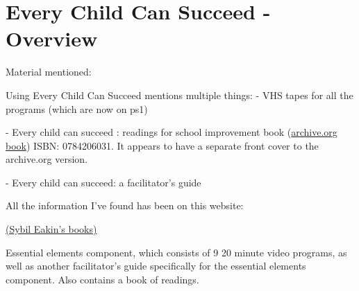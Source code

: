 \chapter{Every Child Can Succeed - Overview}

Material mentioned:

Using Every Child Can Succeed mentions multiple things:
- VHS tapes for all the programs (which are now on ps1)

- Every child can succeed : readings for school improvement book (\href{https://archive.org/details/everychildcansuc0000unse/mode/2up}{archive.org book})
ISBN: 0784206031. It appears to have a separate front cover to the archive.org version.

- Every child can succeed: a facilitator's guide

All the information I've found has been on this website:

\href{https://www.gettextbooks.co.uk/author/Sybil_Eakin}{(Sybil Eakin's books)}

Essential elements component, which consists of 9 20 minute video programs, as well as another facilitator's guide specifically for the essential elements component.
Also contains a book of readings.